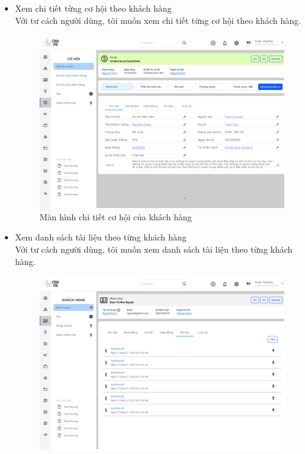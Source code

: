 \documentclass[12pt,a4paper]{article}
\begin{document}
\begin{enumerate}
\begin{itemize}
            \item Xem chi tiết từng cơ hội theo khách hàng \\
            Với tư cách người dùng, tôi muốn xem chi tiết từng cơ hội theo khách hàng.
            \begin{figure}[H]
                \centering \includegraphics[width=\textwidth]{Img/Nguyet/chitietcohoi.png}
                \vspace{0.5cm}
                \caption{Màn hình chi tiết cơ hội của khách hàng}
                \label{chitietcohoiKH}
            \end{figure}
            \item Xem danh sách tài liệu theo từng khách hàng
            \\ Với tư cách người dùng, tôi muốn xem danh sách tài liệu theo từng khách hàng.
            \begin{figure}[H]
                \centering \includegraphics[width=\textwidth]{Img/Nguyet/Khachhang/dsTailieu.png}

\end{figure}
\end{itemize}
\end{enumerate}
\end{document}

